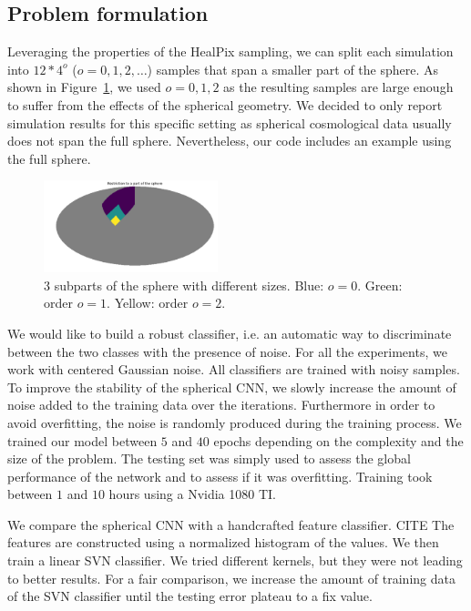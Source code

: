 \documentclass[final,twocolumn,3p,times,authoryear]{elsarticle}
\newcommand{\todo}[1]{{\color[rgb]{.6,.1,.6}{#1}}}
\newcommand{\1}{\b{1}}              %
\newcommand{\0}{\b{0}}              %
\begin{document}
\subsection{Problem formulation}

Leveraging the properties of the HealPix sampling, we can split each simulation
into $12*4^o$ ($o=0,1,2,\dots$) samples that span a smaller part of the sphere.
As shown in Figure~\ref{fig:subpart_sphere}, we used $o=0,1,2$ as the resulting
samples are large enough to suffer from the effects of the spherical geometry. We
decided to only report simulation results for this specific setting as spherical
cosmological data usually does not span the full sphere. Nevertheless, our code
includes an example using the full sphere.

\begin{figure}[!ht]
\centering
\includegraphics[width=0.45\textwidth]{figures/part_sphere.pdf}
\caption{3 subparts of the sphere with different sizes. Blue: $o=0$. Green: order $o=1$. Yellow: order $o=2$.}
\label{fig:subpart_sphere}
\end{figure}

We would like to build a robust classifier, i.e. an automatic way to
discriminate between the two classes with the presence of noise. For all the
experiments, we work with centered Gaussian noise. \todo{Tomek: could you put a
justification.} All classifiers are trained with noisy samples. To improve the
stability of the spherical CNN, we slowly increase the amount of noise added to
the training data over the iterations. Furthermore in order to avoid
overfitting, the noise is randomly produced during the training process. We trained our
model between $5$ and $40$ epochs depending on the complexity and the size of
the problem. The testing set was simply used to assess the global performance of
the network and to assess if it was overfitting.
Training took between $1$ and $10$ hours using a Nvidia 1080 TI.

We compare the spherical CNN with a handcrafted feature classifier. CITE \cite{...}
\todo{Tomek: we probably need 1 or two other classifiers.} The features are
constructed using a normalized histogram of the values. We then train a linear
SVN classifier. We tried different kernels, but they were not leading to better
results. For a fair comparison, we increase the amount of training data of the
SVN classifier until the testing error plateau to a fix value.
\end{document}
